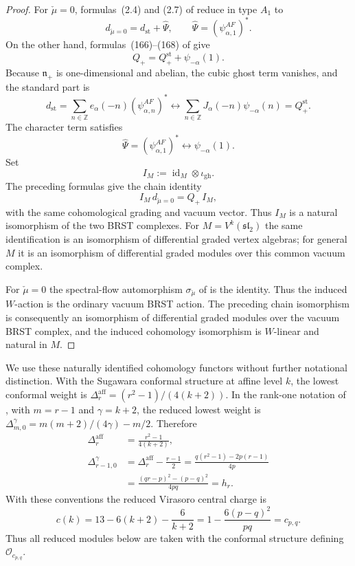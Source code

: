 \documentclass[12pt,leqno]{amsart}
\numberwithin{equation}{section}
\newcommand{\id}{\operatorname{id}}
\newcommand{\Oc}{\mathcal O}
\def\Z{\mathbb{Z}}
\begin{document}
\begin{proof}
For $\check\mu=0$, formulas~(2.4) and (2.7) of
\cite{ArakawaFrenkel} reduce in type $A_1$ to
\[
 d_{\check\mu=0}=d_{\mathrm{st}}+\widehat\Psi,
 \qquad
 \widehat\Psi=(\psi^{AF}_{\alpha,1})^*.
\]
On the other hand, formulas~(166)--(168) of \cite{ArakawaW} give
\[
 Q_+=Q^{\mathrm{st}}_++\psi_{-\alpha}(1).
\]
Because $\mathfrak n_+$ is one-dimensional and abelian, the cubic ghost
term vanishes, and the standard part is
\[
 d_{\mathrm{st}}
 =\sum_{n\in\Z}e_\alpha(-n)(\psi^{AF}_{\alpha,n})^*
 \longleftrightarrow
 \sum_{n\in\Z}J_\alpha(-n)\psi_{-\alpha}(n)
 =Q_+^{\mathrm{st}}.
\]
The character term satisfies
\[
 \widehat\Psi=(\psi^{AF}_{\alpha,1})^*
 \longleftrightarrow
 \psi_{-\alpha}(1).
\]
Set
\[
 I_M:=\id_M\otimes\iota_{\mathrm{gh}}.
\]
The preceding formulas give the chain identity
\[
 I_M\,d_{\check\mu=0}=Q_+\,I_M,
\]
with the same cohomological grading and vacuum vector.  Thus $I_M$ is a natural isomorphism of the two BRST complexes.  For
$M=V^k(\mathfrak{sl}_2)$ the same identification is an isomorphism of
differential graded vertex algebras; for general $M$ it is an
isomorphism of differential graded modules over this common vacuum
complex.

For $\check\mu=0$ the spectral-flow automorphism
$\sigma_{\check\mu}$ of \cite[Section~2.1]{ArakawaFrenkel} is the
identity.  Thus the induced $W$-action is the ordinary vacuum BRST action.
The preceding chain isomorphism is consequently an isomorphism of
differential graded modules over the vacuum BRST complex, and the induced
cohomology isomorphism is $W$-linear and natural in $M$.
\end{proof}

We use these naturally identified cohomology functors without further
notational distinction.  With the Sugawara conformal structure at affine
level $k$, the lowest conformal weight is
$\Delta^{\mathrm{aff}}_r=(r^2-1)/(4(k+2))$.  In the rank-one notation of
\cite[Section~4.4]{ArakawaFrenkel}, with $m=r-1$ and
$\gamma=k+2$, the reduced lowest weight is
$\Delta^\gamma_{m,0}=m(m+2)/(4\gamma)-m/2$.  Therefore
\begin{equation}\label{eq:DS-weight-dictionary}
\begin{aligned}
 \Delta^{\mathrm{aff}}_r&=\frac{r^2-1}{4(k+2)},\\
 \Delta^\gamma_{r-1,0}
 &=\Delta^{\mathrm{aff}}_r-\frac{r-1}{2}
  =\frac{q(r^2-1)-2p(r-1)}{4p}\\
 &=\frac{(qr-p)^2-(p-q)^2}{4pq}=h_r.
\end{aligned}
\end{equation}
With these conventions the reduced Virasoro central charge is
\begin{equation}\label{eq:DS-central-charge}
 c(k)=13-6(k+2)-\frac{6}{k+2}
 =1-\frac{6(p-q)^2}{pq}=c_{p,q}.
\end{equation}
Thus all reduced modules below are taken with the conformal structure
defining $\Oc_{c_{p,q}}$.
\end{document}
